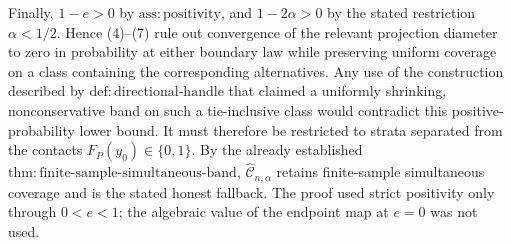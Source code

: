 Finally, \(1-e>0\) by \(\mathrm{ass:positivity}\), and \(1-2\alpha>0\) by the stated restriction \(\alpha<1/2\).  Hence (4)--(7) rule out convergence of the relevant projection diameter to zero in probability at either boundary law while preserving uniform coverage on a class containing the corresponding alternatives.  Any use of the construction described by \(\mathrm{def:directional\text{-}handle}\) that claimed a uniformly shrinking, nonconservative band on such a tie-inclusive class would contradict this positive-probability lower bound.  It must therefore be restricted to strata separated from the contacts \(F_P(y_0)\in\{0,1\}\).  By the already established \(\mathrm{thm:finite\text{-}sample\text{-}simultaneous\text{-}band}\), \(\widehat{\mathcal C}_{n,\alpha}\) retains finite-sample simultaneous coverage and is the stated honest fallback.  The proof used strict positivity only through \(0<e<1\); the algebraic value of the endpoint map at \(e=0\) was not used.
